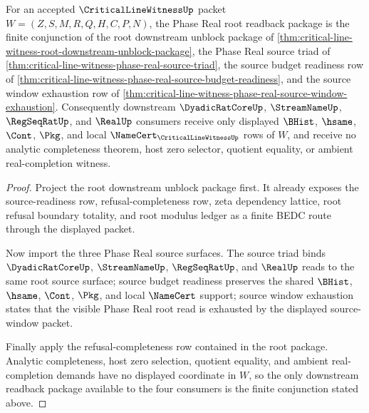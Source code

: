 \begin{theorem}
\label{thm:critical-line-witness-phase-real-root-readback-package}
For an accepted $\CriticalLineWitnessUp$ packet $W=(Z,S,M,R,Q,H,C,P,N)$, the Phase Real root readback package is the finite conjunction of the root downstream unblock package of \autoref{thm:critical-line-witness-root-downstream-unblock-package}, the Phase Real source triad of \autoref{thm:critical-line-witness-phase-real-source-triad}, the source budget readiness row of \autoref{thm:critical-line-witness-phase-real-source-budget-readiness}, and the source window exhaustion row of \autoref{thm:critical-line-witness-phase-real-source-window-exhaustion}. Consequently downstream $\DyadicRatCoreUp$, $\StreamNameUp$, $\RegSeqRatUp$, and $\RealUp$ consumers receive only displayed $\BHist$, $\hsame$, $\Cont$, $\Pkg$, and local $\NameCert_{\CriticalLineWitnessUp}$ rows of $W$, and receive no analytic completeness theorem, host zero selector, quotient equality, or ambient real-completion witness.
\end{theorem}
\begin{proof}
Project the root downstream unblock package first. It already exposes the source-readiness row, refusal-completeness row, zeta dependency lattice, root refusal boundary totality, and root modulus ledger as a finite BEDC route through the displayed packet.

Now import the three Phase Real source surfaces. The source triad binds $\DyadicRatCoreUp$, $\StreamNameUp$, $\RegSeqRatUp$, and $\RealUp$ reads to the same root source surface; source budget readiness preserves the shared $\BHist$, $\hsame$, $\Cont$, $\Pkg$, and local $\NameCert$ support; source window exhaustion states that the visible Phase Real root read is exhausted by the displayed source-window packet.

Finally apply the refusal-completeness row contained in the root package. Analytic completeness, host zero selection, quotient equality, and ambient real-completion demands have no displayed coordinate in $W$, so the only downstream readback package available to the four consumers is the finite conjunction stated above.
\end{proof}


